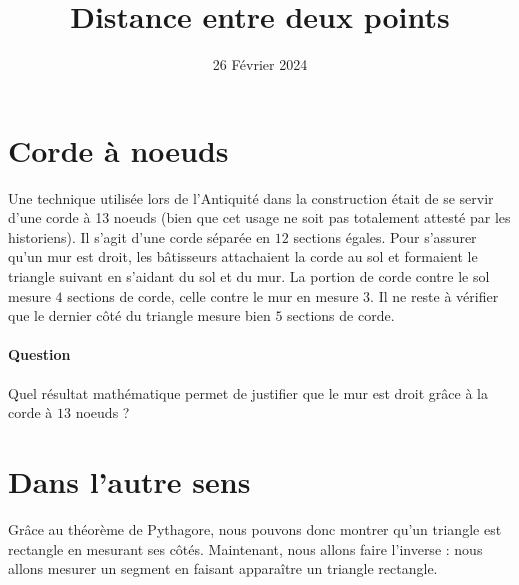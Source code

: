 \documentclass{article}
\title{Distance entre deux points}
\author{}
\date{26 Février 2024}
\begin{document}
\maketitle
\thispagestyle{empty}
\section{Corde à noeuds}
Une technique utilisée lors de l'Antiquité dans la construction était de se servir d'une \og corde à 13 noeuds \fg (bien que cet usage ne soit pas totalement attesté par les historiens). Il s'agit d'une corde séparée en $12$ sections égales. Pour s'assurer qu'un mur est droit, les bâtisseurs attachaient la corde au sol et formaient le triangle suivant en s'aidant du sol et du mur. La portion de corde contre le sol mesure $4$ sections de corde, celle contre le mur en mesure $3$. Il ne reste à vérifier que le dernier côté du triangle mesure bien $5$ sections de corde.
\begin{center}
\vspace{0.5cm}
\end{center}
\paragraph{Question} Quel résultat mathématique permet de justifier que le mur est droit grâce à la corde à $13$ noeuds ?
\newpage
\section{Dans l'autre sens}
Grâce au théorème de Pythagore, nous pouvons donc montrer qu'un triangle est rectangle en mesurant ses côtés. Maintenant, nous allons faire l'inverse : nous allons mesurer un segment en faisant apparaître un triangle rectangle.
\end{document}
